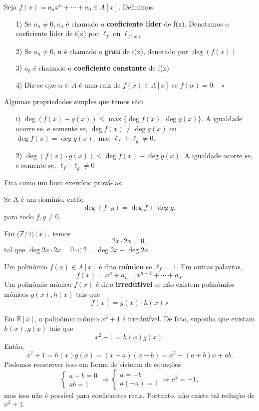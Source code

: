 \documentclass[AlgebraII/algebraII_notes.tex]{subfiles}
\begin{document}
\begin{def*}
	Seja \(f(x) = a_{n}x^{n} + \cdots + a_{0}\in A[x]\). Definimos
	\begin{itemize}
		\item[1)] Se \(a_{n}\neq0, a_{n}\) é chamado o \textbf{coeficiente líder} de f(x). Denotamos o coeficiente líder
		      de f(x) por \(\ell_{f}\) ou \(\ell_{f(x)}\)
		\item[2)] Se \(a_{n}\neq0\), n é chamado o \textbf{grau} de f(x), denotado por \(\deg(f(x))\)
		\item[3)] \(a_{0}\) é chamado o \textbf{coeficiente constante} de f(x)
		\item[4)] Diz-se que \(\alpha\in A\) é uma raiz de \(f(x)\in A[x]\) se \(f(\alpha ) = 0.\quad\square\)
	\end{itemize}
\end{def*}
Algumas propriedades simples que temos são:
\begin{itemize}
	\item[i)] \(\deg{(f(x) + g(x))}\leq \max\{\deg{f(x)}, \deg{g(x)}\}\). A igualdade ocorre se, e somente se,
	      \(\deg{f(x)}\neq \deg{g(x)}\) ou \(\deg{f(x)}=\deg{g(x)},\) mas \(\ell_{f} + \ell_{g}\neq0.\)
	\item[2)] \(\deg{(f(x)\cdot g(x))}\leq \deg{f(x)} + \deg{g(x)}.\) A igualdade ocorre se, e somente se,
	      \(\ell_{f}\cdot \ell_{g} \neq0\)
\end{itemize}
Fica como um bom exercício prová-las.
\begin{example}
	Se A é um domínio, então
	\[
		\deg{(f \cdot g)} = \deg{f} + \deg{g},
	\]
	para todo \(f, g\neq0.\)
\end{example}
\begin{example}
	Em \(\biggl(\mathbb{Z}/4\biggr)[x],\) temos
	\[
		2x \cdot 2x = 0,
	\]
	tal que \(\deg{2x \cdot 2x} = 0 < 2 = \deg{2x} + \deg{2x}.\)
\end{example}
\begin{def*}
	Um polinômio \(f(x)\in A[x]\) é dito \textbf{mônico} se \(\ell_{f} = 1.\) Em outras palavras,
	\[
		f(x) = x^{n} + a_{n-1}x^{n-1} + \cdots + a_{0}.
	\]
	Um polinômio mônico \(f(x)\) é dito \textbf{irredutível} se não existem polinômios mônicos
	\(g(x), h(x)\) tais que
	\[
		f(x) = g(x)\cdot h(x).\square
	\]
\end{def*}
\begin{example}
	Em \(\mathbb{R}[x]\), o polinômio mônico \(x^{2} + 1\) é irredutível. De fato, suponha que existam
	\(h(x), g(x)\) tais que
	\[
		x^{2} + 1 = h(x)g(x).
	\]
	Então,
	\[
		x^{2} + 1 = h(x)g(x) = (x-a)(x-b) = x^{2} - (a+b)x +ab.
	\]
	Podemos reescrever isso em forma de sistema de equações
	\[
		\left\{\begin{array}{ll}
			a + b = 0 \\
			ab = 1
		\end{array}\right.
		\Rightarrow
		\left\{\begin{array}{ll}
			a = -b \\
			a(-a) = 1
		\end{array}\right.
		\Rightarrow
		a^{2} = -1,
	\]
	mas isso não é possível para coeficientes reais. Portanto, não existe tal redução de \(x^{2} + 1.\)
\end{example}
\end{document}
